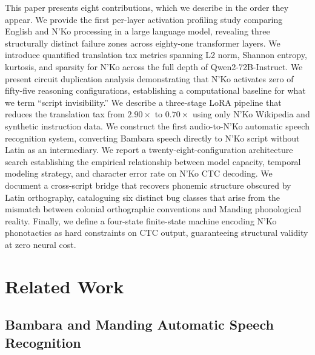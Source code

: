\documentclass[11pt]{article}
\newcommand{\nko}{N'Ko}
\begin{document}
This paper presents eight contributions, which we describe in the order they appear. We provide the first per-layer activation profiling study comparing English and \nko{} processing in a large language model, revealing three structurally distinct failure zones across eighty-one transformer layers. We introduce quantified translation tax metrics spanning L2 norm, Shannon entropy, kurtosis, and sparsity for \nko{} across the full depth of Qwen2-72B-Instruct. We present circuit duplication analysis demonstrating that \nko{} activates zero of fifty-five reasoning configurations, establishing a computational baseline for what we term ``script invisibility.'' We describe a three-stage LoRA pipeline that reduces the translation tax from $2.90\times$ to $0.70\times$ using only \nko{} Wikipedia and synthetic instruction data. We construct the first audio-to-\nko{} automatic speech recognition system, converting Bambara speech directly to \nko{} script without Latin as an intermediary. We report a twenty-eight-configuration architecture search establishing the empirical relationship between model capacity, temporal modeling strategy, and character error rate on \nko{} CTC decoding. We document a cross-script bridge that recovers phonemic structure obscured by Latin orthography, cataloguing six distinct bug classes that arise from the mismatch between colonial orthographic conventions and Manding phonological reality. Finally, we define a four-state finite-state machine encoding \nko{} phonotactics as hard constraints on CTC output, guaranteeing structural validity at zero neural cost.

\section{Related Work}
\label{sec:related_work}

\subsection{Bambara and Manding Automatic Speech Recognition}
\label{sec:related_bambara}
\end{document}
